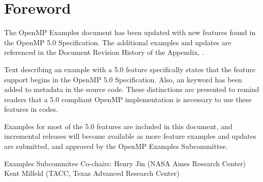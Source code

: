\pagebreak
\chapter*{Foreword}
\label{chap:foreword}

The OpenMP Examples document has been updated with new features
found in the OpenMP 5.0 Specification. The additional examples and updates
are referenced in the Document Revision History of the Appendix, .

Text describing an example with a 5.0 feature specifically states
that the feature support begins in the OpenMP 5.0 Specification.  Also,
an  keyword has been added to metadata in the source code.
These distinctions are presented to remind readers that a 5.0 compliant 
OpenMP implementation is necessary to use these features in codes.

Examples for most of the 5.0 features are included in this document,
and incremental releases will become available as more feature examples
and updates are submitted, and approved by the OpenMP Examples Subcommittee.

\bigskip
Examples Subcommitee Co-chairs: \smallskip\linebreak
Henry Jin (\textsc{NASA} Ames Research Center) \linebreak
Kent Milfeld (\textsc{TACC}, Texas Advanced Research Center)
